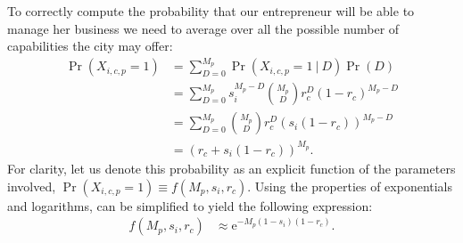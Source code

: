 \documentclass[12pt]{article}
\newcommand{\e}{\text{e}}
\begin{document}
To correctly compute the probability that our entrepreneur will be able to manage her business we need to average  over all the possible number of capabilities the city may offer:
\begin{align}
	\Pr(X_{i,c,p}=1) &= \sum_{D=0}^{M_p}\Pr(X_{i,c,p}=1~|~D)\Pr(D) \nonumber \\
	&= \sum_{D=0}^{M_p}s_i^{M_p-D}\binom{M_p}{D}r_c^{D}(1-r_c)^{M_p-D} \nonumber \\
	&= \sum_{D=0}^{M_p}\binom{M_p}{D}r_c^{D}(s_i(1-r_c))^{M_p-D} \nonumber \\
	&= (r_c + s_i(1-r_c))^{M_p}.
	\label{eq_prob}
\end{align}
For clarity, let us denote this probability as an explicit function of the parameters involved, $\Pr(X_{i,c,p}=1)\equiv f(M_p, s_i, r_c)$. Using the properties of exponentials and logarithms,  can be simplified to yield the following expression:
\begin{align}
	f(M_p, s_i, r_c) &\approx \e^{ - M_p (1-s_i)(1-r_c)}.
	\label{eq_approx}
\end{align}
\end{document}
